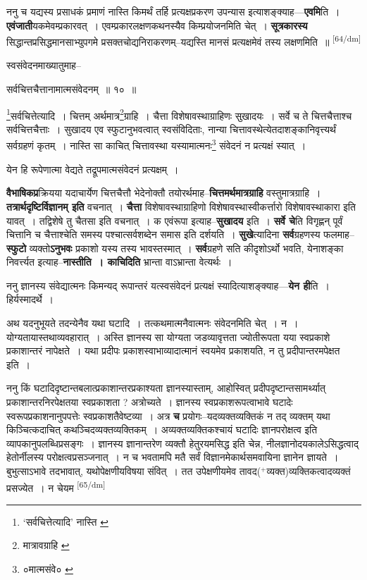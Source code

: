 \documentclass[article,12pt,a4paper]{memoir}
\newcommand{\add}[1]{($^{+}$#1)}
\begin{document}
	  \pstart ननु च यद्यस्य प्रसाधकं प्रमाणं नास्ति किमर्थं तर्हि प्रत्यक्षप्रकरण उपन्यास इत्याशङ्क्याह—\textbf{एवमि}ति । \textbf{एवंजाती}यकमेवम्प्रकारवत् । एवम्प्रकारलक्षणकथनस्यैव किम्प्रयोजनमिति चेत् । \textbf{सूत्रकारस्य} सिद्धान्तप्रसिद्धमानसाभ्युपगमे प्रसक्तचोद्यनिराकरणम्--यद्यस्ति मानसं प्रत्यक्षमेवं तस्य लक्षणमिति ॥
	\pend
      \leavevmode\textsuperscript{\rmlatinfont\tiny [64/dm]}

	  \pstart स्वसंवेदनमाख्यातुमाह--
	\pend
       

	  \pstart सर्वचित्तचैत्तानामात्मसंवेदनम् ॥ १० ॥
	\pend
       

	  \pstart \footnote{‘सर्वचित्तेत्यादि’ नास्ति \cite{dp-msA} \cite{dp-msC}}सर्वचित्तेत्यादि । चित्तम् अर्थमात्र\footnote{मात्रावग्राहि \cite{dp-msC}}ग्राहि । चैत्ता विशेषावस्थाग्राहिणः सुखादयः । सर्वे च ते चित्तचैत्ताश्च सर्वचित्तचैत्ताः । सुखादय एव स्फुटानुभवत्वात् स्वसंविदिताः, नान्या चित्तावस्थेत्येतदाशङ्कानिवृत्त्यर्थं सर्वग्रहणं कृतम् । नास्ति सा काचित् चित्तावस्था यस्यामात्मनः\footnote{०मात्मसंवे० \cite{dp-msD}} संवेदनं न प्रत्यक्षं स्यात् ।
	\pend
       

	  \pstart येन हि रूपेणात्मा वेद्यते तद्रूपमात्मसंवेदनं प्रत्यक्षम् ।
	\pend
      

	  \pstart \textbf{वैभाषिकप्र}क्रियया यदाचार्येण चित्तचैत्तौ भेदेनोक्तौ तयोरर्थमाह--\textbf{चित्तमर्थमात्रग्राहि} वस्तुमात्रग्राहि । \textbf{तत्रार्थदृष्टिर्विज्ञानम् इति} वचनात् । \textbf{चैत्ता} विशेषावस्थाग्राहिणो विशेषावस्थास्वीकर्त्तारो विशेषावस्थाकारा इति यावत् । तद्विशेषे तु चैतसा इति वचनात् । क एवंरूपा इत्याह--\textbf{सुखादय} इति । \textbf{सर्वे चे}ति विगृह्णन् पूर्वं चित्तानि च चैत्ताश्चेति समस्य पश्चात्सर्वशब्देन समास इति दर्शयति । \textbf{सुखे}त्यादिना \textbf{सर्व}ग्रहणस्य फलमाह--\textbf{स्फुटो} व्यक्तो\textbf{ऽनुभवः} प्रकाशो यस्य तस्य भावस्तस्मात् । \textbf{सर्व}ग्रहणे सति कीदृशोऽर्थो भवति, येनाशङ्का निवर्त्त्यत इत्याह--\textbf{नास्तीति । काचिदिति} भ्रान्ता वाऽभ्रान्ता वेत्यर्थः ।
	\pend
      

	  \pstart ननु ज्ञानस्य संवेद्यात्मनः किमन्यद् रूपान्तरं यत्स्वसंवेदनं प्रत्यक्षं स्यादित्याशङ्क्याह—\textbf{येन ही}ति । हिर्यस्मादर्थे ।
	\pend
      

	  \pstart अथ यदनुभूयते तदन्येनैव यथा घटादि । तत्कथमात्मनैवात्मनः संवेदनमिति चेत् । न । योग्यतायास्तथाव्यवहारात् । अस्ति ज्ञानस्य सा योग्यता जडव्यावृत्तता ज्योतीरूपता यया स्वप्रकाशे प्रकाशान्तरं नापेक्षते । यथा प्रदीपः प्रकाशस्वाभाव्यादात्मानं स्वयमेव प्रकाशयति, न तु प्रदीपान्तरमपेक्षत इति ।
	\pend
      

	  \pstart ननु किं घटादिदृष्टान्तबलात्प्रकाशान्तरप्रकाश्यता ज्ञानस्यास्ताम्, आहोस्वित् प्रदीपदृष्टान्तसामर्थ्यात् प्रकाशान्तरनिरपेक्षतया स्वप्रकाशता ? अत्रोच्यते । ज्ञानस्य स्वप्रकाशरूपत्वाभावे घटादेः स्वरूपप्रकाशनानुपपत्तेः स्वप्रकाशतैवेष्टव्या । अत्र \textbf{च} प्रयोगः--यदव्यक्तव्यक्तिकं न तद् व्यक्तम् यथा किञ्चित्कदाचित् कथञ्चिदव्यक्तव्यक्तिकम् । अव्यक्तव्यक्तिकश्चायं घटादिः ज्ञानपरोक्षत्व इति व्यापकानुपलब्धिप्रसङ्गः । ज्ञानस्य ज्ञानान्तरेण व्यक्तौ हेतुरयमसिद्ध इति चेन्न, नीलज्ञानोदयकालेऽसिद्धत्वाद् हेतोर्नीलस्य परोक्षत्वप्रसञ्जनात् । न च भवतामपि मतै सर्वं विज्ञानमेकार्थसमवायिना ज्ञानेन ज्ञायते । बुभुत्साऽभावे तदभावात्, यथोपेक्षणीयविषया संवित् । तत उपेक्षणीयमेव तावद\add{व्यक्त}व्यक्तिकत्वादव्यक्तं प्रसज्येत । न चेयम  \leavevmode\textsuperscript{\rmlatinfont\tiny [65/dm]} 
	  
\end{document}
